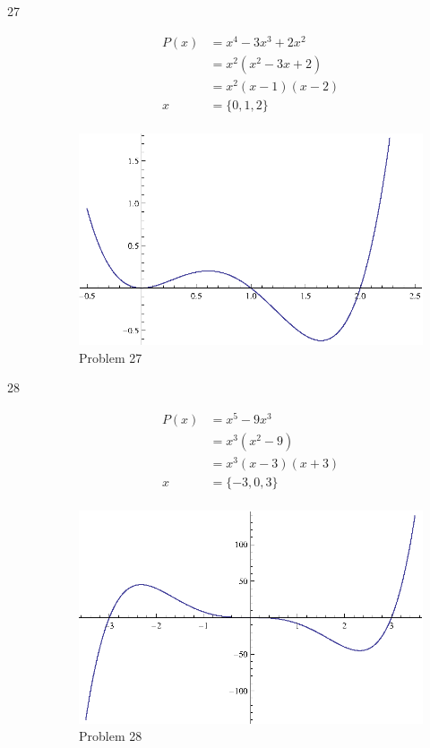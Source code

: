 \documentclass{exam}
\begin{document}
\begin{description}
    \item[27] 
      \begin{align*}
        P(x) &= x^4 - 3x^3 + 2x^2 \\
             &= x^2(x^2 - 3x + 2) \\
             &= x^2(x - 1)(x - 2) \\
        x    &= \{ 0, 1, 2 \} \\
      \end{align*}
      
      \begin{figure}[H]
        \centering
        \includegraphics[scale=0.9]{problem27.eps}
        \caption*{Problem 27}
      \end{figure}

    \pagebreak

    \item[28] 
      \begin{align*}
        P(x) &= x^5 - 9x^3 \\
             &= x^3(x^2 - 9) \\
             &= x^3(x - 3)(x + 3) \\
        x    &= \{ -3, 0, 3 \} \\
      \end{align*}
      
      \begin{figure}[H]
        \centering
        \includegraphics[scale=0.9]{problem28.eps}
        \caption*{Problem 28}
      \end{figure}


\end{description}
\end{document}

